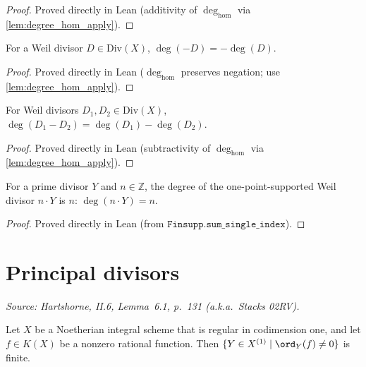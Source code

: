\begin{proof}
  Proved directly in Lean (additivity of \(\deg_{\mathrm{hom}}\) via
  \ref{lem:degree_hom_apply}).
\end{proof}
\begin{lemma}

  \label{lem:degree_neg}
  For a Weil divisor \(D \in \mathrm{Div}(X)\), \(\deg(-D) = -\deg(D)\).
\end{lemma}
\begin{proof}
  Proved directly in Lean (\(\deg_{\mathrm{hom}}\) preserves negation; use
  \ref{lem:degree_hom_apply}).
\end{proof}
\begin{lemma}

  \label{lem:degree_sub}
  For Weil divisors \(D_1, D_2 \in \mathrm{Div}(X)\),
  \(\deg(D_1 - D_2) = \deg(D_1) - \deg(D_2)\).
\end{lemma}
\begin{proof}
  Proved directly in Lean (subtractivity of \(\deg_{\mathrm{hom}}\) via
  \ref{lem:degree_hom_apply}).
\end{proof}
\begin{lemma}

  \label{lem:degree_single}
  For a prime divisor \(Y\) and \(n \in \mathbb Z\), the degree of the
  one-point-supported Weil divisor \(n \cdot Y\) is \(n\):
  \(\deg(n \cdot Y) = n\).
\end{lemma}
\begin{proof}
  Proved directly in Lean (from \(\texttt{Finsupp.sum\_single\_index}\)).
\end{proof}
\section{Principal divisors}
\begin{lemma}

  \label{lem:rationalMap_order_finite_support}
  \textit{Source: Hartshorne, II.6, Lemma~6.1, p.~131 (a.k.a.\ Stacks 02RV).}

  Let \(X\) be a Noetherian integral scheme that is regular in
  codimension one, and let \(f \in K(X)\) be a nonzero rational function.
  Then \(\{Y \in X^{(1)} \mid \ord_Y(f) \ne 0\}\) is finite.
\end{lemma}

